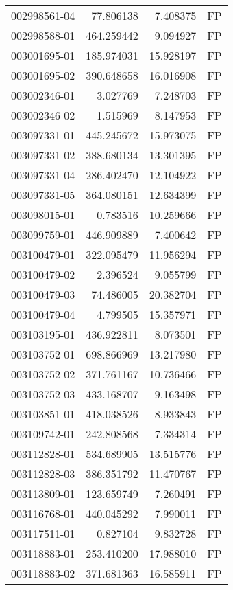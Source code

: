 \begin{tabular}{lrrl}
002998561-04 &   77.806138 &     7.408375 &   FP \\
002998588-01 &  464.259442 &     9.094927 &   FP \\
003001695-01 &  185.974031 &    15.928197 &   FP \\
003001695-02 &  390.648658 &    16.016908 &   FP \\
003002346-01 &    3.027769 &     7.248703 &   FP \\
003002346-02 &    1.515969 &     8.147953 &   FP \\
003097331-01 &  445.245672 &    15.973075 &   FP \\
003097331-02 &  388.680134 &    13.301395 &   FP \\
003097331-04 &  286.402470 &    12.104922 &   FP \\
003097331-05 &  364.080151 &    12.634399 &   FP \\
003098015-01 &    0.783516 &    10.259666 &   FP \\
003099759-01 &  446.909889 &     7.400642 &   FP \\
003100479-01 &  322.095479 &    11.956294 &   FP \\
003100479-02 &    2.396524 &     9.055799 &   FP \\
003100479-03 &   74.486005 &    20.382704 &   FP \\
003100479-04 &    4.799505 &    15.357971 &   FP \\
003103195-01 &  436.922811 &     8.073501 &   FP \\
003103752-01 &  698.866969 &    13.217980 &   FP \\
003103752-02 &  371.761167 &    10.736466 &   FP \\
003103752-03 &  433.168707 &     9.163498 &   FP \\
003103851-01 &  418.038526 &     8.933843 &   FP \\
003109742-01 &  242.808568 &     7.334314 &   FP \\
003112828-01 &  534.689905 &    13.515776 &   FP \\
003112828-03 &  386.351792 &    11.470767 &   FP \\
003113809-01 &  123.659749 &     7.260491 &   FP \\
003116768-01 &  440.045292 &     7.990011 &   FP \\
003117511-01 &    0.827104 &     9.832728 &   FP \\
003118883-01 &  253.410200 &    17.988010 &   FP \\
003118883-02 &  371.681363 &    16.585911 &   FP \\

\end{tabular}
